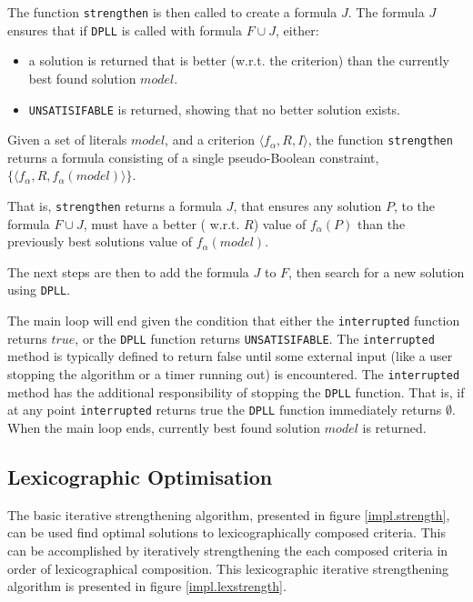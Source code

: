 The function \texttt{strengthen} is then called to create a formula $J$.
The formula $J$ ensures that if \texttt{DPLL} is called with formula $F \cup J$, either:
\begin{itemize}
  \item a solution is returned that is better (w.r.t. the criterion) than the currently best found solution $model$. 
  \item \texttt{UNSATISIFABLE} is returned, showing that no better solution exists.
\end{itemize}

\begin{defs}
Given a set of literals $model$, and a criterion $\langle f_{\alpha}, R, I \rangle$,
the function \texttt{strengthen} returns a formula consisting of a single pseudo-Boolean constraint, $\{ \langle f_{\alpha},R,f_{\alpha}(model) \rangle \}$.
\end{defs}
That is, \texttt{strengthen} returns a formula $J$,
that ensures any solution $P$, to the formula $F \cup J$, must have a better ( w.r.t. $R$) value of $f_{\alpha}(P)$ than the previously best solutions value of $f_{\alpha}(model)$.

The next steps are then to add the formula $J$ to $F$, then search for a new solution using \texttt{DPLL}.

The main loop will end given the condition that either the \texttt{interrupted} function returns $true$, or the \texttt{DPLL} function returns \texttt{UNSATISIFABLE}.
The \texttt{interrupted} method is typically defined to return false until some external input (like a user stopping the algorithm or a timer running out) is encountered.
The \texttt{interrupted} method has the additional responsibility of stopping the \texttt{DPLL} function.
That is, if at any point \texttt{interrupted} returns true the \texttt{DPLL} function immediately returns $\emptyset$.
When the main loop ends, currently best found solution $model$ is returned.

\subsection{Lexicographic Optimisation}
\label{impl.lexiterstre}
The basic iterative strengthening algorithm, presented in figure \ref{impl.strength}, can be used find optimal solutions to lexicographically composed criteria.
This can be accomplished by iteratively strengthening the each composed criteria in order of lexicographical composition.
This lexicographic iterative strengthening algorithm is presented in figure \ref{impl.lexstrength}.

